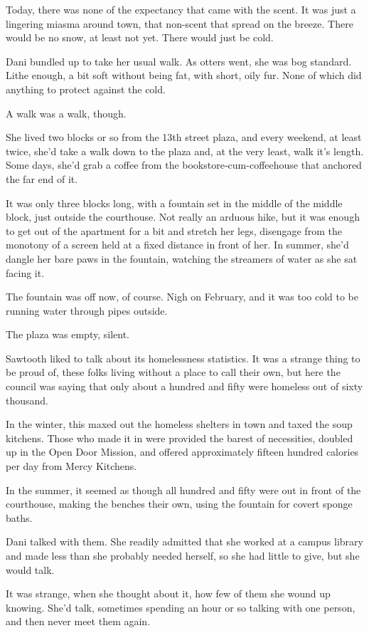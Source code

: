 Today, there was none of the expectancy that came with the scent. It was just a lingering miasma around town, that non-scent that spread on the breeze. There would be no snow, at least not yet. There would just be cold.

Dani bundled up to take her usual walk. As otters went, she was bog standard. Lithe enough, a bit soft without being fat, with short, oily fur. None of which did anything to protect against the cold.

A walk was a walk, though.

She lived two blocks or so from the 13th street plaza, and every weekend, at least twice, she'd take a walk down to the plaza and, at the very least, walk it's length. Some days, she'd grab a coffee from the bookstore-cum-coffeehouse that anchored the far end of it.

It was only three blocks long, with a fountain set in the middle of the middle block, just outside the courthouse. Not really an arduous hike, but it was enough to get out of the apartment for a bit and stretch her legs, disengage from the monotony of a screen held at a fixed distance in front of her. In summer, she'd dangle her bare paws in the fountain, watching the streamers of water as she sat facing it.

The fountain was off now, of course. Nigh on February, and it was too cold to be running water through pipes outside.

The plaza was empty, silent.

Sawtooth liked to talk about its homelessness statistics. It was a strange thing to be proud of, these folks living without a place to call their own, but here the council was saying that only about a hundred and fifty were homeless out of sixty thousand.

In the winter, this maxed out the homeless shelters in town and taxed the soup kitchens. Those who made it in were provided the barest of necessities, doubled up in the Open Door Mission, and offered approximately fifteen hundred calories per day from Mercy Kitchens.

In the summer, it seemed as though all hundred and fifty were out in front of the courthouse, making the benches their own, using the fountain for covert sponge baths.

Dani talked with them. She readily admitted that she worked at a campus library and made less than she probably needed herself, so she had little to give, but she would talk.

It was strange, when she thought about it, how few of them she wound up knowing. She'd talk, sometimes spending an hour or so talking with one person, and then never meet them again.

